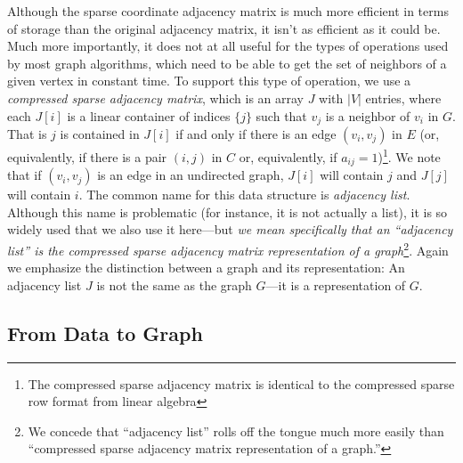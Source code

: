 Although the sparse coordinate adjacency matrix is much more efficient in terms of storage than the original adjacency matrix, it isn't as efficient as it could be.  
Much more importantly, it does not at all useful for the types of operations used by most graph algorithms, which need to be able to get the set of neighbors of a given vertex in constant time.  
To support this type of operation, we use a \emph{compressed sparse adjacency matrix}, which is an array $J$ with $|V|$ entries, where each $J[i]$ is a linear container of indices $\{ j \}$ such that $v_j$ is a neighbor of $v_i$ in $G$.  
That is $j$ is contained in $J[i]$ if and only if there is an edge $(v_i, v_j)$ in $E$ (or, equivalently, if there is a pair $(i, j)$ in $C$ or, equivalently, if $a_{ij} = 1$)\footnote{The compressed sparse adjacency matrix is identical to the compressed sparse row format from linear algebra}.  
We note that if $(v_i, v_j)$ is an edge in an undirected graph, $J[i]$ will contain $j$ and $J[j]$ will contain $i$. 
The common name for this data structure is \emph{adjacency list}.  
Although this name is problematic (for instance, it is not actually a list),  it is so widely used that we also use it here---but \emph{we mean specifically that an  ``adjacency list'' is the compressed sparse adjacency matrix representation of a graph}\footnote{We concede that ``adjacency list'' rolls off the tongue much more easily than ``compressed sparse adjacency matrix representation of a graph.''}.  
Again we emphasize the distinction between a graph and its representation:  An adjacency list $J$ is not the same as the graph $G$---it is a representation of $G$.


\subsection{From Data to Graph}

